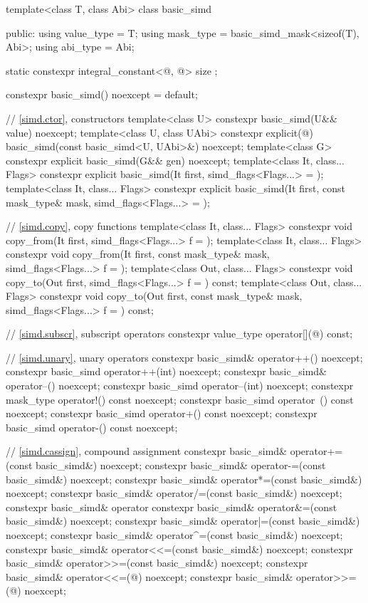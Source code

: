 \begin{codeblock}
template<class T, class Abi> class basic_simd {
public:
  using value_type = T;
  using mask_type = basic_simd_mask<sizeof(T), Abi>;
  using abi_type = Abi;

  static constexpr integral_constant<@\simdsizetype@, @> size {};

  constexpr basic_simd() noexcept = default;

  // \ref{simd.ctor},  constructors
  template<class U> constexpr basic_simd(U&& value) noexcept;
  template<class U, class UAbi>
    constexpr explicit(@\seebelow@) basic_simd(const basic_simd<U, UAbi>&) noexcept;
  template<class G> constexpr explicit basic_simd(G&& gen) noexcept;
  template<class It, class... Flags>
    constexpr explicit basic_simd(It first, simd_flags<Flags...> = {});
  template<class It, class... Flags>
    constexpr explicit basic_simd(It first, const mask_type& mask, simd_flags<Flags...> = {});

  // \ref{simd.copy},  copy functions
  template<class It, class... Flags>
    constexpr void copy_from(It first, simd_flags<Flags...> f = {});
  template<class It, class... Flags>
    constexpr void copy_from(It first, const mask_type& mask, simd_flags<Flags...> f = {});
  template<class Out, class... Flags>
    constexpr void copy_to(Out first, simd_flags<Flags...> f = {}) const;
  template<class Out, class... Flags>
    constexpr void copy_to(Out first, const mask_type& mask, simd_flags<Flags...> f = {}) const;

  // \ref{simd.subscr},  subscript operators
  constexpr value_type operator[](@\simdsizetype@) const;

  // \ref{simd.unary},  unary operators
  constexpr basic_simd& operator++() noexcept;
  constexpr basic_simd operator++(int) noexcept;
  constexpr basic_simd& operator--() noexcept;
  constexpr basic_simd operator--(int) noexcept;
  constexpr mask_type operator!() const noexcept;
  constexpr basic_simd operator~() const noexcept;
  constexpr basic_simd operator+() const noexcept;
  constexpr basic_simd operator-() const noexcept;

  // \ref{simd.cassign},  compound assignment
  constexpr basic_simd& operator+=(const basic_simd&) noexcept;
  constexpr basic_simd& operator-=(const basic_simd&) noexcept;
  constexpr basic_simd& operator*=(const basic_simd&) noexcept;
  constexpr basic_simd& operator/=(const basic_simd&) noexcept;
  constexpr basic_simd& operator%
  constexpr basic_simd& operator&=(const basic_simd&) noexcept;
  constexpr basic_simd& operator|=(const basic_simd&) noexcept;
  constexpr basic_simd& operator^=(const basic_simd&) noexcept;
  constexpr basic_simd& operator<<=(const basic_simd&) noexcept;
  constexpr basic_simd& operator>>=(const basic_simd&) noexcept;
  constexpr basic_simd& operator<<=(@\simdsizetype@) noexcept;
  constexpr basic_simd& operator>>=(@\simdsizetype@) noexcept;

}
\end{codeblock}
